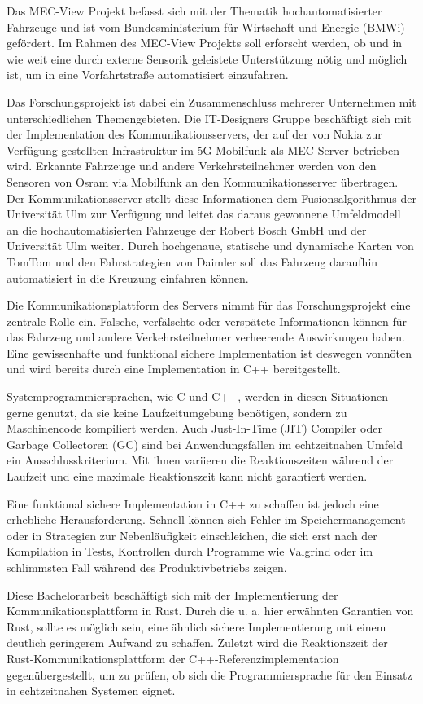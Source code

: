\begin{multicols}{2}
Das MEC-View Projekt befasst sich mit der Thematik hochautomatisierter Fahrzeuge und ist vom Bundesministerium für Wirtschaft und Energie (BMWi) gefördert.
Im Rahmen des MEC-View Projekts soll erforscht werden, ob und in wie weit eine durch externe Sensorik geleistete Unterstützung nötig und möglich ist, um in eine Vorfahrtstraße automatisiert einzufahren.

\bildIII

Das Forschungsprojekt ist dabei ein Zusammenschluss mehrerer Unternehmen mit unterschiedlichen Themengebieten. Die IT-Designers Gruppe beschäftigt sich mit der Implementation des Kommunikationsservers, der auf der von Nokia zur Verfügung gestellten
Infrastruktur im 5G Mobilfunk als MEC Server betrieben wird. Erkannte Fahrzeuge und
andere Verkehrsteilnehmer werden von den Sensoren von Osram via Mobilfunk an den
Kommunikationsserver übertragen. Der Kommunikationsserver stellt diese Informationen
dem Fusionsalgorithmus der Universität Ulm zur Verfügung und leitet das daraus gewonnene Umfeldmodell an die hochautomatisierten Fahrzeuge der Robert Bosch GmbH und der Universität
Ulm weiter. Durch hochgenaue, statische und dynamische Karten von TomTom und den
Fahrstrategien von Daimler soll das Fahrzeug daraufhin automatisiert in die Kreuzung
einfahren können.

Die Kommunikationsplattform des Servers nimmt für das Forschungsprojekt eine zentrale Rolle ein.
Falsche, verfälschte oder verspätete Informationen können für das Fahrzeug und andere Verkehrsteilnehmer verheerende Auswirkungen haben.
Eine gewissenhafte und funktional sichere Implementation ist deswegen vonnöten und wird bereits durch eine Implementation in C++ bereitgestellt.

Systemprogrammiersprachen, wie C und C++, werden in diesen Situationen gerne genutzt, da sie keine Laufzeitumgebung benötigen, sondern zu Maschinencode kompiliert werden.
Auch Just-In-Time (JIT) Compiler oder Garbage Collectoren (GC) sind bei Anwendungsfällen im echtzeitnahen Umfeld ein Ausschlusskriterium.
Mit ihnen variieren die Reaktionszeiten während der Laufzeit und eine maximale Reaktionszeit kann nicht garantiert werden.

Eine funktional sichere Implementation in C++ zu schaffen ist jedoch eine erhebliche Herausforderung.
Schnell können sich Fehler im Speichermanagement oder in Strategien zur Nebenläufigkeit einschleichen, die sich erst nach der Kompilation in Tests, Kontrollen durch Programme wie Valgrind oder im schlimmsten Fall während des Produktivbetriebs zeigen.

\vfill\null
\columnbreak

Diese Bachelorarbeit beschäftigt sich mit der Implementierung der Kommunikationsplattform in Rust.
Durch die u. a. hier erwähnten Garantien von Rust, sollte es möglich sein, eine ähnlich sichere Implementierung mit einem deutlich geringerem Aufwand zu schaffen.
Zuletzt wird die Reaktionszeit der Rust-Kommunikationsplattform der C++-Referenzimplementation  gegenübergestellt, um zu prüfen, ob sich die Programmiersprache für den Einsatz in echtzeitnahen Systemen eignet.




\bildII

\end{multicols}
